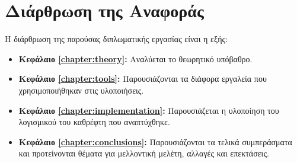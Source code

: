 \section{Διάρθρωση της Αναφοράς}
\label{section:layout}

Η διάρθρωση της παρούσας διπλωματικής εργασίας είναι η εξής:

\begin{itemize}
	\item{\textbf{Κεφάλαιο \ref{chapter:theory}:} Αναλύεται το θεωρητικό υπόβαθρο. 
	}
	\item{\textbf{Κεφάλαιο \ref{chapter:tools}:} Παρουσιάζονται τα διάφορα εργαλεία που χρησιμοποιήθηκαν στις υλοποιήσεις.
	}
	\item{\textbf{Κεφάλαιο \ref{chapter:implementation}:} Παρουσιάζεται η υλοποίηση του λογισμικού του καθρέφτη που αναπτύχθηκε.
	}
	\item{\textbf{Κεφάλαιο \ref{chapter:conclusions}:} Παρουσιάζονται τα τελικά συμπεράσματα και προτείνονται θέματα για μελλοντική μελέτη, αλλαγές και επεκτάσεις.
	}

\end{itemize}

